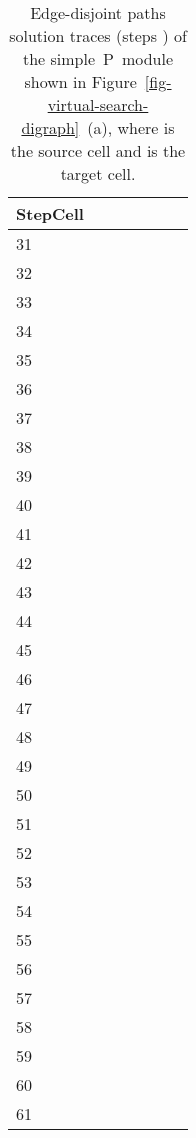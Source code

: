 \documentclass[preliminary,copyright,creativecommons]{eptcs}
\newcommand{\myway}[1]{\raisebox{-4pt}{\rule{0pt}{16pt}}\colorbox[rgb]{.7,.7,.7}{#1}}
\theoremstyle{remark}
\begin{document}
\begin{table}[h]
\caption{Edge-disjoint paths solution traces (steps ) of the 
simple~P~module shown in Figure~\ref{fig-virtual-search-digraph}~(a),
where  is the source cell and  is the target cell.}
\label{tab-trace1}
\begin{center}
\renewcommand{\tabcolsep}{3.0pt}
\renewcommand{\arraystretch}{1.3}
\footnotesize
\noindent
\begin{tabular}{ | l | l | l | l | l | l | l | }
\hline
StepCell
 &  &  &  &  &  &  \\ \hline
31 &  &  &  &  &  &  \\ \hline
32 &  &  &  &  &  &  \\ \hline
33 &  &  &  &  &  &  \\ \hline
34 &  &  &  &  &  &  \\ \hline
35 &  &  &  &  &  &  \\ \hline
36 &  &  &  &  &  &  \\ \hline
37 &  &  &  &  &  &  \\ \hline
38 &  &  &  &  &  &  \\ \hline
39 &  &  &  &  &  &  \\ \hline
40 &  &  &  &  &  &  \\ \hline
41 &  &  &  &  &  &  \\ \hline
42 &  &  &  &  &  &  \\ \hline
43 &  &  &  &  &  &  \\ \hline
44 &  &  &  &  &  &  \\ \hline
45 &  &  &  &  &  &  \\ \hline
46 &  &  &  &  &  &  \\ \hline
47 &  &  &  &  &  & \myway{} \\ \hline
48 &  &  &  &  & \myway{} &  \\ \hline
49 &  &  & \myway{} &  &  &  \\ \hline
50 &  & \myway{} &  &  &  &  \\ \hline
51 & \myway{} &  &  &  &  &  \\ \hline
52 &  &  &  &  &  &  \\ \hline
53 &  &  &  &  &  &  \\ \hline
54 &  &  &  &  &  &  \\ \hline
55 &  &  &  &  &  &  \\ \hline
56 &  &  &  &  &  &  \\ \hline
57 &  &  &  &  &  &  \\ \hline
58 &  &  &  &  &  &  \\ \hline
59 &  &  &  &  &  &  \\ \hline
60 &  &  &  &  &  &  \\ \hline
61 & \myway{} & \myway{} & \myway{} & \myway{} & \myway{} & \myway{} \\ \hline
\end{tabular}
\end{center}
\end{table}
\end{document}
